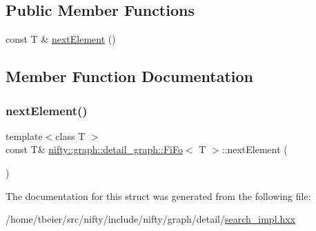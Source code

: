 \subsection*{Public Member Functions}
\begin{DoxyCompactItemize}
\item 
const T \& \hyperlink{structnifty_1_1graph_1_1detail__graph_1_1FiFo_ab67906202356718d337ef1c9c28386ee}{next\+Element} ()
\end{DoxyCompactItemize}


\subsection{Member Function Documentation}
\mbox{\label{structnifty_1_1graph_1_1detail__graph_1_1FiFo_ab67906202356718d337ef1c9c28386ee}} 
\subsubsection{\texorpdfstring{next\+Element()}{nextElement()}}
{\footnotesize\ttfamily template$<$class T $>$ \\
const T\& \hyperlink{structnifty_1_1graph_1_1detail__graph_1_1FiFo}{nifty\+::graph\+::detail\+\_\+graph\+::\+Fi\+Fo}$<$ T $>$\+::next\+Element (\begin{DoxyParamCaption}{ }\end{DoxyParamCaption})\hspace{0.3cm}{\ttfamily [inline]}}



The documentation for this struct was generated from the following file\+:\begin{DoxyCompactItemize}
\item 
/home/tbeier/src/nifty/include/nifty/graph/detail/\hyperlink{search__impl_8hxx}{search\+\_\+impl.\+hxx}\end{DoxyCompactItemize}
